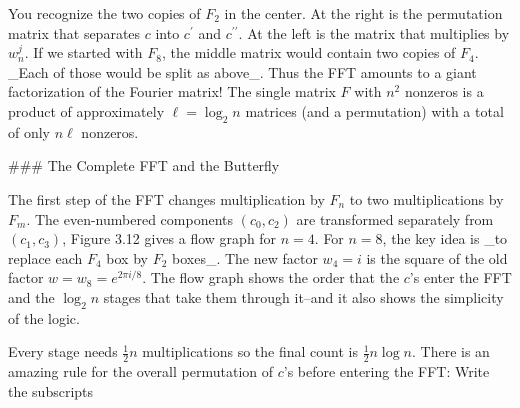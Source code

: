 You recognize the two copies of \(F_{2}\) in the center. At the right is the permutation matrix that separates \(c\) into \(c^{\prime}\) and \(c^{\prime\prime}\). At the left is the matrix that multiplies by \(w_{n}^{j}\). If we started with \(F_{8}\), the middle matrix would contain two copies of \(F_{4}\). _Each of those would be split as above_. Thus the FFT amounts to a giant factorization of the Fourier matrix! The single matrix \(F\) with \(n^{2}\) nonzeros is a product of approximately \(\ell=\log_{2}n\) matrices (and a permutation) with a total of only \(n\ell\) nonzeros.

### The Complete FFT and the Butterfly

The first step of the FFT changes multiplication by \(F_{n}\) to two multiplications by \(F_{m}\). The even-numbered components \((c_{0},c_{2})\) are transformed separately from \((c_{1},c_{3})\), Figure 3.12 gives a flow graph for \(n=4\). For \(n=8\), the key idea is _to replace each \(F_{4}\) box by \(F_{2}\) boxes_. The new factor \(w_{4}=i\) is the square of the old factor \(w=w_{8}=e^{2\pi i/8}\). The flow graph shows the order that the \(c\)'s enter the FFT and the \(\log_{2}n\) stages that take them through it--and it also shows the simplicity of the logic.

Every stage needs \(\frac{1}{2}n\) multiplications so the final count is \(\frac{1}{2}n\log n\). There is an amazing rule for the overall permutation of \(c\)'s before entering the FFT: Write the subscripts 